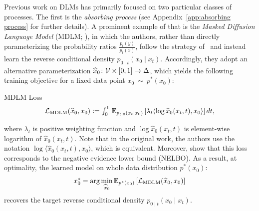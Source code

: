 
  Previous work on DLMs has primarily focused on two particular classes of processes. The first is the \textit{absorbing process} (see Appendix~\ref{app:absorbing process} for further details). A prominent example of that is the \textit{Masked Diffusion Language Model} (MDLM; \citealp{sahoo2024simple, shi2024simplified}), in which the authors, rather than directly parameterizing the probability ratios $\frac{p_t(y)}{p_t(x)}$, follow the strategy of~\citet{ho2020denoising, austin2021structured, campbell2022continuous} and instead learn the reverse conditional density $p_{0\mid t}(x_0 \mid x_t)$. Accordingly, they adopt an alternative parameterization $\widehat{x}_0\colon \mathcal{V} \times [0, 1] \to \Delta$, which yields the following training objective for a fixed data point $x_0~\sim~p^*(x_0)$:
  \begin{Box1}{MDLM Loss}
    \vspace{-8pt}
    \begin{gather}
      \textstyle \mathcal{L}_{\text{MDLM}}(\widehat{x}_0, x_0) \vcentcolon= \int_0^1 \, \mathbb{E}_{p_{t|0}(x_t \mid x_0)} \left[
          \lambda_{t} \langle \log\widehat{x}_0(x_t, t), x_0 \rangle
      \right]dt,
    \label{eq:mdlm loss}
    \end{gather}
  \end{Box1}
  where $\lambda_{t}$ is positive weighting function and $\log \widehat{x}_0(x_t, t)$ is element-wise logarithm of $\widehat{x}_0(x_t, t)$. Note that in the original work, the authors use the notation $\log \langle \widehat{x}_0(x_t, t), x_0 \rangle$, which is equivalent. Moreover, \citep{sahoo2024simple} show that this loss corresponds to the negative evidence lower bound (NELBO). As a result, at optimality, the learned model on whole data distribution $p^*(x_0)$: 
  \[
    x_0^* = \arg\min_{\widehat{x}_0} \mathbb{E}_{p^*(x_0)}\left[\mathcal{L}_{\text{MDLM}}(\widehat{x}_0, x_0)\right]
  \]
  recovers the target reverse conditional density $p_{0\mid t}(x_0 \mid x_t).$


